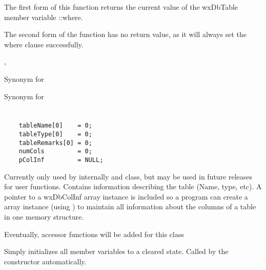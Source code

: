 


The first form of this function returns the current value of the wxDbTable 
member variable ::where.  

The second form of the function has no return value, as it will always set 
the where clause successfully. 


, 



\label{wxdbtableplusplus}


Synonym for 




\label{wxdbtableminusminus}


Synonym for 




\section{}\label{wxdbtableinf}

\begin{verbatim}
    tableName[0]    = 0;
    tableType[0]    = 0;
    tableRemarks[0] = 0;
    numCols         = 0;
    pColInf         = NULL;
\end{verbatim}


Currently only used by  internally 
and  class, but may be used in future releases for 
user functions.  Contains information describing the table (Name, type, etc). 
A pointer to a wxDbColInf array instance is included so a program can create a 
 array instance (using 
) 
to maintain all information about the columns of a table in one memory 
structure.

Eventually, accessor functions will be added for this class


\label{wxdbtableinfinitialize}

Simply initializes all member variables to a cleared state.  Called by 
the constructor automatically.
